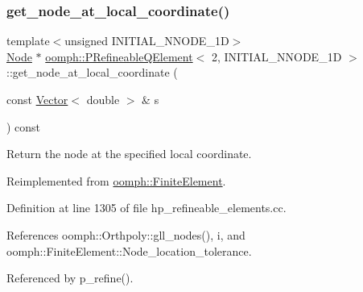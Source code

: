 \subsubsection{\texorpdfstring{get\+\_\+node\+\_\+at\+\_\+local\+\_\+coordinate()}{get\_node\_at\_local\_coordinate()}}
{\footnotesize\ttfamily template$<$unsigned I\+N\+I\+T\+I\+A\+L\+\_\+\+N\+N\+O\+D\+E\+\_\+1D$>$ \\
\hyperlink{classoomph_1_1Node}{Node} $\ast$ \hyperlink{classoomph_1_1PRefineableQElement}{oomph\+::\+P\+Refineable\+Q\+Element}$<$ 2, I\+N\+I\+T\+I\+A\+L\+\_\+\+N\+N\+O\+D\+E\+\_\+1D $>$\+::get\+\_\+node\+\_\+at\+\_\+local\+\_\+coordinate (\begin{DoxyParamCaption}\item[{const \hyperlink{classoomph_1_1Vector}{Vector}$<$ double $>$ \&}]{s }\end{DoxyParamCaption}) const\hspace{0.3cm}{\ttfamily [virtual]}}



Return the node at the specified local coordinate. 



Reimplemented from \hyperlink{classoomph_1_1FiniteElement_a2ddbb05c5f8bb35b64bec287d653105c}{oomph\+::\+Finite\+Element}.



Definition at line 1305 of file hp\+\_\+refineable\+\_\+elements.\+cc.



References oomph\+::\+Orthpoly\+::gll\+\_\+nodes(), i, and oomph\+::\+Finite\+Element\+::\+Node\+\_\+location\+\_\+tolerance.



Referenced by p\+\_\+refine().

\mbox{\label{classoomph_1_1PRefineableQElement_3_012_00_01INITIAL__NNODE__1D_01_4_af5792fe3ee774090f759b0a7dac6fddc}} 

